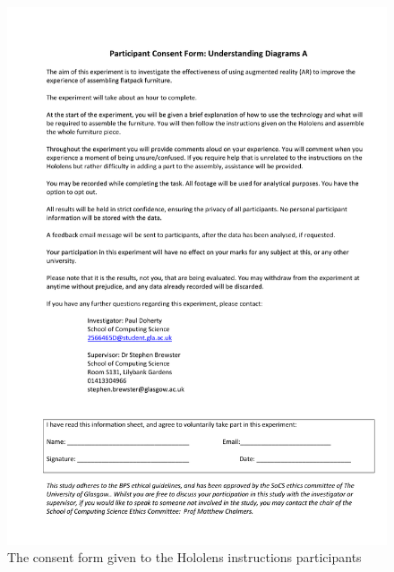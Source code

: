 \documentclass{l4proj}
\begin{document}
\begin{appendices}
\begin{figure}
    \centering
    \includegraphics[width=1\linewidth]{dissertation//images/consentFormHololens.pdf}
    \caption{The consent form given to the Hololens instructions participants}
\end{figure}


\end{appendices}
\end{document}
